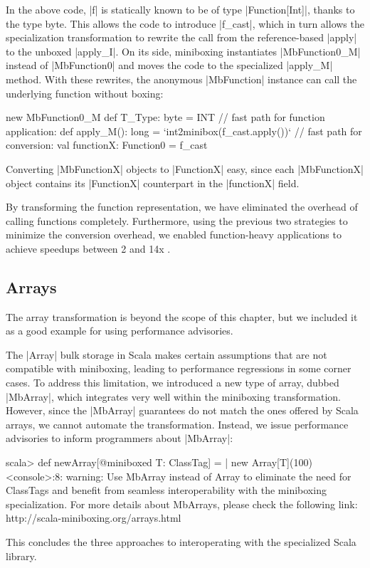 In the above code, |f| is statically known to be of type |Function[Int]|, thanks to the type byte. This allows the code to introduce |f_cast|, which in turn allows the specialization transformation to rewrite the call from the reference-based |apply| to the unboxed |apply_I|. On its side, miniboxing instantiates |MbFunction0_M| instead of |MbFunction0| and moves the code to the specialized |apply_M| method. With these rewrites, the anonymous |MbFunction| instance can call the underlying function without boxing:

\begin{lstlisting-nobreak}
   new MbFunction0_M {
     def T_Type: byte = INT
     // fast path for function application:
     def apply_M(): long = `int2minibox(f_cast.apply())`
     // fast path for conversion:
     val functionX: Function0 = f_cast
   }
\end{lstlisting-nobreak}

Converting |MbFunctionX| objects to |FunctionX| easy, since each |MbFunctionX| object contains its |FunctionX| counterpart in the |functionX| field.

By transforming the function representation, we have eliminated the overhead of calling functions completely. Furthermore, using the previous two strategies to minimize the conversion overhead, we enabled function-heavy applications to achieve speedups between 2 and 14x \cite{ildl-plugin-wiki}.

\subsection{Arrays}
\label{mbox2:sec:mbarrays}

The array transformation \cite{romain-mbarrays} is beyond the scope of this chapter, but we included it as a good example for using performance advisories.

The |Array| bulk storage in Scala makes certain assumptions that are not compatible with miniboxing, leading to performance regressions in some corner cases. To address this limitation, we introduced a new type of array, dubbed |MbArray|, which integrates very well within the miniboxing transformation. However, since the |MbArray| guarantees do not match the ones offered by Scala arrays, we cannot automate the transformation. Instead, we issue performance advisories to inform programmers about |MbArray|:

\begin{lstlisting-nobreak-nolang}
scala> def newArray[@miniboxed T: ClassTag] =
       |   new Array[T](100)
<console>:8: warning: Use MbArray instead of Array to eliminate the need for ClassTags and benefit from seamless interoperability with the miniboxing specialization. For more details about MbArrays, please check the following link: http://scala-miniboxing.org/arrays.html
\end{lstlisting-nobreak-nolang}

This concludes the three approaches to interoperating with the specialized Scala library.